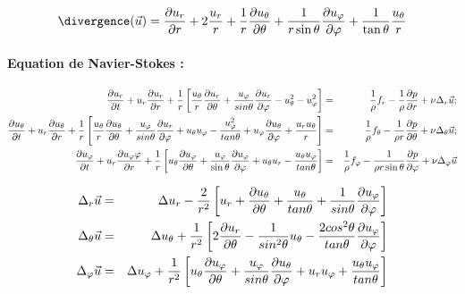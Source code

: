 $$\divergence(\vec{u})=\frac{\partial u_r}{\partial r} + 2 \frac{u_r}{r} + \frac{1}{r} \frac{\partial u_\theta}{\partial \theta} + \frac{1}{r \sin \theta} \frac{\partial u_\varphi}{\partial \varphi} + \frac{1}{\tan \theta} \frac{u_\theta}{r} 
$$

\paragraph{Equation de Navier-Stokes :}




\begin{eqnarray*}
\frac {\partial u_r} {\partial t} + u_r \frac {\partial u_r} {\partial r} 
+\frac{1}{r} \left[ 
 	\frac{u_{\theta}}{r} \frac {\partial u_r} {\partial \theta} 
	+ \frac{u_{\varphi}}{sin \theta} \frac {\partial u_r} {\partial \varphi} 
	- u_{\theta}^2 - u_{\varphi}^2
	\right] 
& = &
\frac{1}{\rho} f_r - \frac{1}{\rho} \frac {\partial p} {\partial r} +  \nu \Delta_r \vec{u};
\\
\frac {\partial u_{\theta}} {\partial t} 
+ u_r \frac {\partial u_{\theta}} {\partial r} 
+ \frac{1}{r} \left[ 
		\frac{u_{\theta}}{r} \frac {\partial u_{\theta}} {\partial \theta} 
		+ \frac{u_{\varphi}}{sin \theta} \frac {\partial u_r} {\partial \varphi} 
		+ u_\theta u_\varphi - \frac{u_\varphi^2}{tan \theta} 
		+ u_\varphi \frac {\partial u_{\theta}} {\partial \varphi} + \frac{u_r u_{\theta}}{r}
		\right] 
& = &
\frac{1}{\rho} f_{\theta} - \frac{1}{\rho r} \frac {\partial p} {\partial \theta} 
 +  \nu \Delta_\theta \vec{u}; 
 \\
\frac {\partial u_\varphi} {\partial t} + u_r \frac {\partial u_\varphi\varphi} {\partial r} 
+\frac{1}{r} \left[ 
	u_{\theta} \frac {\partial u_\varphi} {\partial \theta} 
	+ \frac{u_\varphi}{\sin \theta} \frac {\partial u_\varphi} {\partial \varphi} 
	+ u_\theta u_r - \frac{u_\theta u_\varphi}{tan \theta} 
		\right] 
&=&
\frac{1}{\rho} f_\varphi - \frac{1}{\rho r \sin \theta} \frac {\partial p} {\partial \varphi} + \nu \Delta_\varphi \vec{u}
\end{eqnarray*}



\begin{eqnarray*}
\Delta_r \vec{u}
&=& 
 \Delta u_r 
- \frac{2}{r^2} \left[   u_r +     \frac {\partial  u_\theta} {\partial \theta} 
				+ \frac{u_\theta}{tan \theta}
				+ \frac{1}{sin \theta}  \frac {\partial  u_\varphi} {\partial \varphi} 
				\right] 
\\
\Delta_\theta \vec{u}
&=&
 \Delta u_\theta 
 + \frac{1}{r^2} \left[   2  \frac {\partial  u_r} {\partial \theta}
				- \frac{1}{sin^2  \theta} u_\theta
				 - \frac{2 cos^2 \theta}{tan \theta} \frac {\partial u_\varphi} {\partial \varphi}
				\right]
\\
\Delta_\varphi \vec{u} 
&=&
\Delta u_\varphi  
+ \frac{1}{r^2} \left[        u_\theta \frac {\partial u_\varphi} {\partial \theta} 
				+ \frac{u_\varphi}{sin \theta}\frac {\partial u_\theta} {\partial \varphi} 
				+ u_r u_\varphi   + \frac{u_\theta u_\varphi }{tan \theta} 
				\right]
\end{eqnarray*}

